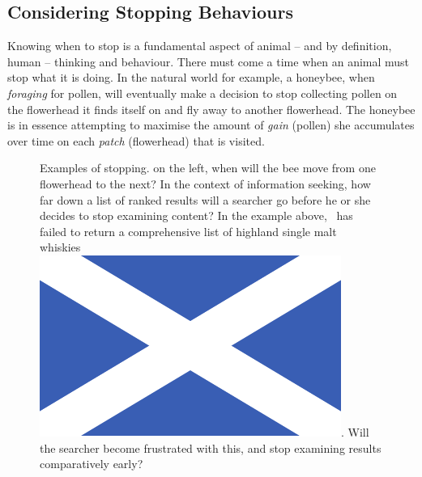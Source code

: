 \subsection{Considering Stopping Behaviours}
Knowing when to stop is a fundamental aspect of animal -- and by definition, human -- thinking and behaviour. There must come a time when an animal must stop what it is doing. In the natural world for example, a honeybee, when \emph{foraging} for pollen, will eventually make a decision to stop collecting pollen on the flowerhead it finds itself on and fly away to another flowerhead. The honeybee is in essence attempting to maximise the amount of \emph{gain} (pollen) she accumulates over time on each \emph{patch} (flowerhead) that is visited.

\begin{figure}[t!]
    \centering
    \caption[Basic stopping examples]{Examples of stopping. on the left, when will the bee move from one flowerhead to the next? In the context of information seeking, how far down a list of ranked results will a searcher go before he or she decides to stop examining content? In the example above, \searchlogo~has failed to return a comprehensive list of highland single malt whiskies~\includegraphics[height=\fontcharht\font`\d]{figures/ch0-saltire.pdf}. Will the searcher become frustrated with this, and stop examining results comparatively early?}
    \label{fig:ch1-stopping}
\end{figure}

